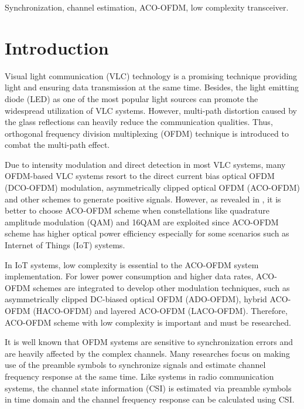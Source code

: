 \documentclass[10pt,journal]{IEEEtran}
\begin{document}
\begin{IEEEkeywords}
Synchronization, channel estimation, ACO-OFDM, low complexity transceiver.
\end{IEEEkeywords}



\section{Introduction}
Visual light communication (VLC) technology\cite{Chi2015,Qian2016Synchronisation} is a promising technique providing light and ensuring data transmission at the same time. Besides, the light emitting diode (LED) \cite{tsonev20143,ferreira2016high} as one of the most popular light sources can promote the widespread utilization of VLC systems. However, multi-path distortion caused by the glass reflections can heavily reduce the communication qualities. Thus, orthogonal frequency division multiplexing (OFDM) technique is introduced to combat the multi-path effect.

Due to intensity modulation and direct detection in most VLC systems, many OFDM-based VLC systems resort to the direct current bias optical OFDM (DCO-OFDM) modulation, asymmetrically clipped optical OFDM (ACO-OFDM) and other schemes to generate positive signals. However, as revealed in \cite{Dissanayake2013Comparison}, it is better to choose ACO-OFDM scheme when constellations like quadrature amplitude modulation (QAM) and 16QAM are exploited since ACO-OFDM scheme has higher optical power efficiency especially for some scenarios such as Internet of Things (IoT) systems.

In IoT systems, low complexity is essential to the ACO-OFDM system implementation. For lower power consumption and higher data rates, ACO-OFDM schemes are integrated to develop other modulation techniques, such as asymmetrically clipped DC-biased optical OFDM (ADO-OFDM), hybrid ACO-OFDM (HACO-OFDM) and layered ACO-OFDM (LACO-OFDM)\cite{yang2016novel,Wang2017Optical}. Therefore, ACO-OFDM scheme with low complexity is important and must be researched.

It is well known that OFDM systems are sensitive to synchronization errors and are heavily affected by the complex channels. Many researches focus on making use of the preamble symbols to synchronize signals and estimate channel frequency response at the same time. Like systems in radio communication systems, the channel state information (CSI) is estimated via preamble symbols in time domain and the channel frequency response can be calculated using CSI.
\end{document}
